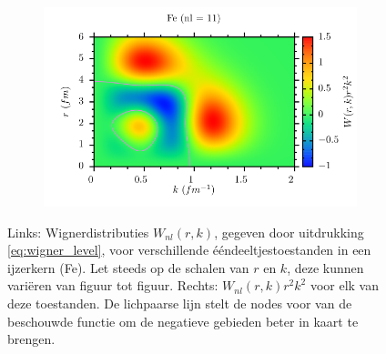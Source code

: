 \documentclass[11pt,twoside]{book}
\begin{document}
\begin{figure}
\begin{subfigure}[b]{0.49\textwidth}
 \end{subfigure} 
 \begin{subfigure}[b]{0.49\textwidth} 
 	\includegraphics[width=\textwidth]{./figuren/Fe_wigner_11prob.pdf}  
 \end{subfigure} 
 \caption{Links: Wignerdistributies $W_{nl}(r,k)$, gegeven door uitdrukking \eqref{eq:wigner_level}, voor verschillende \'{e}\'{e}ndeeltjestoestanden in een ijzerkern (Fe). Let steeds op de schalen van $r$ en $k$, deze kunnen vari\"{e}ren van figuur tot figuur. Rechts: $W_{nl}(r,k)r^2 k^2$ voor elk van deze toestanden. De lichpaarse lijn stelt de nodes voor van de beschouwde functie om de negatieve gebieden beter in kaart te brengen.}  \label{fig:wigner_iron2}
\end{figure}
\end{document}
